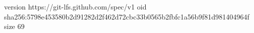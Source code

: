 version https://git-lfs.github.com/spec/v1
oid sha256:5798e453580b2d91282d2f462d72cbc33b0565b2fbfc1a56b9f81d981404964f
size 69
